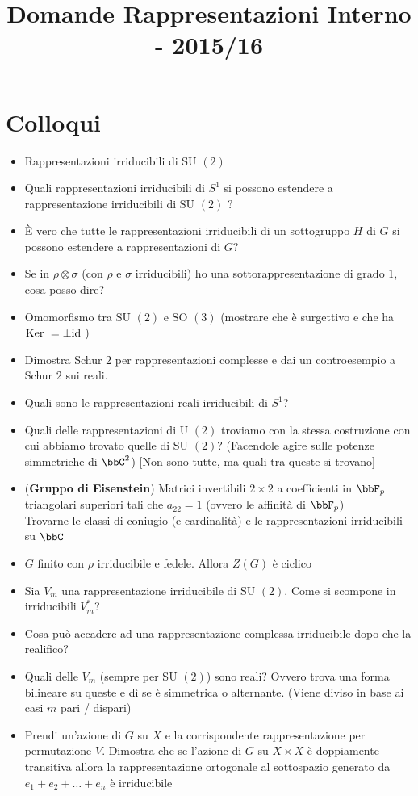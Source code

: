\documentclass[a4paper,NoNotes,GeneralMath]{stdmdoc}
\newcommand{\SU}{\text{SU }}
\newcommand{\SO}{\text{SO }}
\newcommand{\U}{\text{U }}
\begin{document}
	\title{Domande Rappresentazioni Interno - 2015/16}

	\section*{Colloqui}
	\begin{itemize}
		\item Rappresentazioni irriducibili di $\SU(2)$
		\item Quali rappresentazioni irriducibili di $S^1$ si possono estendere a rappresentazione irriducibili di $\SU(2)$ ?
		\item È vero che tutte le rappresentazioni irriducibili di un sottogruppo $H$ di $G$ si possono estendere a rappresentazioni di $G$?
		\item Se in $\rho \otimes \sigma$ (con $\rho$ e $\sigma$ irriducibili) ho una sottorappresentazione di grado $1$, cosa posso dire?
		\item Omomorfismo tra $\SU(2)$ e $\SO(3)$ (mostrare che è surgettivo e che ha $\mbox{Ker } = \pm \mbox{id}$ )
		\item Dimostra Schur $2$ per rappresentazioni complesse e dai un controesempio a Schur $2$ sui reali.
		\item Quali sono le rappresentazioni reali irriducibili di $S^1$?
		\item Quali delle rappresentazioni di $\U(2)$ troviamo con la stessa costruzione con cui abbiamo trovato quelle di $\SU(2)$? (Facendole agire sulle potenze simmetriche di $\bbC^2$) [Non sono tutte, ma quali tra queste si trovano]
		\item ({\bf Gruppo di Eisenstein}) Matrici invertibili $2\times 2$ a coefficienti in $\bbF_p$ triangolari superiori tali che $a_{22} = 1$ (ovvero le affinità di $\bbF_p$) \\
			Trovarne le classi di coniugio (e cardinalità) e le rappresentazioni irriducibili su $\bbC$
		\item $G$ finito con $\rho$ irriducibile e fedele. Allora $Z(G)$ è ciclico
		\item Sia $V_m$ una rappresentazione irriducibile di $\SU(2)$. Come si scompone in irriducibili $V_m^*$?
		\item Cosa può accadere ad una rappresentazione complessa irriducibile dopo che la realifico?
		\item Quali delle $V_m$ (sempre per $\SU(2)$) sono reali? Ovvero trova una forma bilineare su queste e dì se è simmetrica o alternante. (Viene diviso in base ai casi $m$ pari / dispari)
		\item Prendi un'azione di $G$ su $X$ e la corrispondente rappresentazione per permutazione $V$. Dimostra che se l'azione di $G$ su $X\times X$ è doppiamente transitiva allora la rappresentazione ortogonale al sottospazio generato da ${e_1 + e_2 + \ldots + e_n}$ è irriducibile

\end{itemize}
\end{document}
